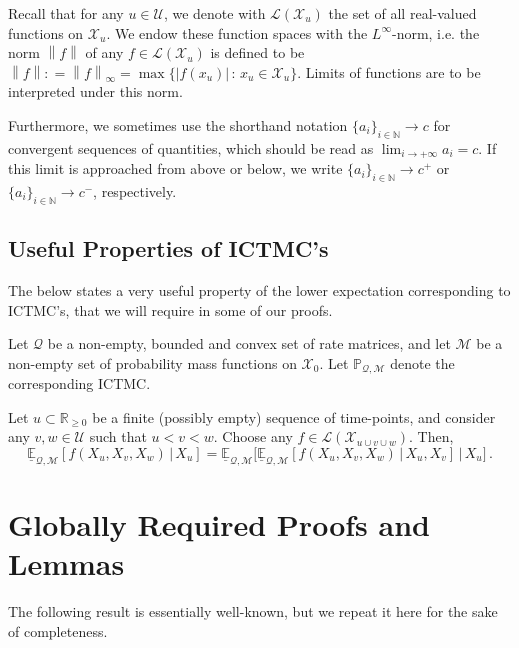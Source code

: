 \documentclass[twoside,11pt]{article}
\newcommand{\nats}{\mathbb{N}}
\newcommand{\reals}{\mathbb{R}}
\newcommand{\realsnonneg}{\reals_{\geq 0}}
\newcommand{\states}{\mathcal{X}}
\newcommand{\lexp}{\underline{\mathbb{E}}_{\rateset,\mathcal{M}}}
\newcommand{\gambles}{\mathcal{L}}
\newcommand{\rateset}{\mathcal{Q}}
\newcommand{\norm}[1]{\left\lVert #1 \right\rVert}
\newcommand{\abs}[1]{\left\vert #1 \right\vert}
\newcommand{\coloneqq}{:\!=}
\begin{document}
Recall that for any $u\in\mathcal{U}$, we denote with $\gambles(\states_u)$ the set of all real-valued functions on $\states_u$. We endow these function spaces with the $L^\infty$-norm, i.e. the norm $\norm{f}$ of any $f\in\gambles(\states_u)$ is defined to be $\norm{f}\coloneqq\norm{f}_\infty=\max\{\abs{f(x_u)}\,:\,x_u\in\states_u\}$. Limits of functions are to be interpreted under this norm.

Furthermore, we sometimes use the shorthand notation $\{a_i\}_{i\in\nats}\to c$ for convergent sequences of quantities, which should be read as $\lim_{i\to+\infty}a_i=c$. If this limit is approached from above or below, we write $\{a_i\}_{i\in\nats}\to c^+$ or $\{a_i\}_{i\in\nats}\to c^-$, respectively.

\subsection{Useful Properties of ICTMC's}

The below states a very useful property of the lower expectation corresponding to ICTMC's, that we will require in some of our proofs.

\begin{lemma}\cite[Theorem 6.5]{krak2016ictmc}\label{lemma:iterated_lower}

Let $\rateset$ be a non-empty, bounded and convex set of rate matrices, and let $\mathcal{M}$ be a non-empty set of probability mass functions on $\states_0$. Let $\mathbb{P}_{\rateset,\mathcal{M}}$ denote the corresponding ICTMC.

Let $u\subset\realsnonneg$ be a finite (possibly empty) sequence of time-points, and consider any $v,w\in\mathcal{U}$ such that $u<v<w$. Choose any $f\in\gambles(\states_{u\cup v\cup w})$. Then,
\begin{equation*}
\lexp[f(X_u,X_v,X_w)\,\vert\,X_u] = \lexp\bigl[\lexp[f(X_u,X_v,X_w)\,\vert\,X_u,X_v]\,\vert\,X_u\bigr]\,.
\end{equation*}
\end{lemma}

\section{Globally Required Proofs and Lemmas}

The following result is essentially well-known, but we repeat it here for the sake of completeness.
\end{document}
